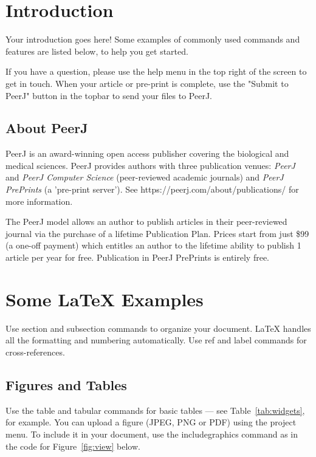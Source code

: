 \documentclass[fleqn,10pt,lineno]{wlpeerj} %
\begin{document}
\iffalse

\newpage{}
\section*{Introduction}

Your introduction goes here! Some examples of commonly used commands and features are listed below, to help you get started.

If you have a question, please use the help menu in the top right of the screen to get in touch. When your article or pre-print is complete, use the "Submit to PeerJ" button in the topbar to send your files to PeerJ.

\subsection*{About PeerJ}

PeerJ is an award-winning open access publisher covering the biological and medical sciences.  PeerJ provides authors with three publication venues: \textit{PeerJ} and \textit{PeerJ Computer Science} (peer-reviewed academic journals) and \textit{PeerJ PrePrints} (a 'pre-print server'). See https://peerj.com/about/publications/ for more information.

The PeerJ model allows an author to publish articles in their peer-reviewed journal via the purchase of a lifetime Publication Plan. Prices start from just \$99 (a one-off payment) which entitles an author to the lifetime ability to publish 1 article per year for free. Publication in PeerJ PrePrints is entirely free.

\section*{Some \LaTeX{} Examples}
\label{sec:examples}

Use section and subsection commands to organize your document. \LaTeX{} handles all the formatting and numbering automatically. Use ref and label commands for cross-references.

\subsection*{Figures and Tables}

Use the table and tabular commands for basic tables --- see Table~\ref{tab:widgets}, for example. You can upload a figure (JPEG, PNG or PDF) using the project menu. To include it in your document, use the includegraphics command as in the code for Figure~\ref{fig:view} below.
\end{document}
